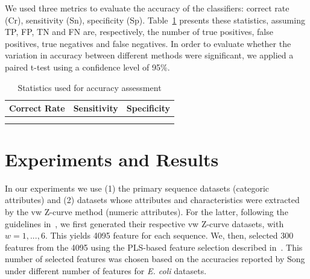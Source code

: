 \documentclass{sig-alternate}
\theoremstyle{plain}
\begin{document}
We used three metrics to evaluate the accuracy of the classifiers: correct rate (Cr), sensitivity (Sn), specificity (Sp). Table~\ref{table:acc}  presents these statistics, assuming TP, FP, TN and FN are, respectively, the number of true positives, false positives, true negatives and false negatives.  In order to evaluate whether the variation in accuracy between different methods were significant, we applied a paired t-test using  a confidence level of 95\%.

\begin{table}

\caption{Statistics used for accuracy assessment \label{table:acc}}
\begin{center}
    \renewcommand{\arraystretch}{1.2}
    \begin{tabular}{>{\centering\arraybackslash} m{3.0cm} 
                    >{\centering\arraybackslash} m{2.0cm} 
                    >{\centering\arraybackslash} m{2.0cm}}
        \hline
            Correct Rate & Sensitivity & Specificity \\
        \hline
            \multirow{2}{*}{$\dfrac {TP+TN}{TP+FP+TN+FN}$}       &
            \multirow{2}{*}{$\dfrac {TP}{TP+FN}$}                &
            \multirow{2}{*}{$\dfrac {TN}{TN+FP}$}                \\
            & & \\
        \hline
    \end{tabular}
\end{center}
\vspace{-1.0cm}
\end{table}


\section{Experiments and Results}
\label{sec:results}

In our experiments we use (1) the primary sequence datasets (categoric attributes) and (2)  datasets whose attributes  and characteristics were extracted by the vw Z-curve method (numeric attributes).  For the latter,  following the guidelines in~\cite{song2011a}, we  first generated their respective  vw Z-curve datasets,  with $ w = 1, ..., 6 $.  This yields 4095 feature for each sequence. We, then,  selected 300 features from the 4095 using the PLS-based feature selection described in~\cite{song2011a}. This number of selected features was chosen based on the accuracies reported by Song under different number of features for {\it E. coli } datasets. 
\end{document}
